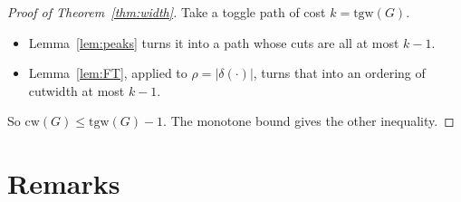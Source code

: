 \documentclass[11pt]{article}
\theoremstyle{definition}
\theoremstyle{remark}
\newcommand{\tgw}{\mathrm{tgw}}
\newcommand{\cw}{\mathrm{cw}}
\begin{document}
\begin{proof}[Proof of Theorem~\ref{thm:width}]
Take a toggle path of cost $k=\tgw(G)$.
\begin{itemize}
\item Lemma~\ref{lem:peaks} turns it into a path whose cuts are all at most
$k-1$.
\item Lemma~\ref{lem:FT}, applied to $\rho=|\delta(\cdot)|$, turns that into
an ordering of cutwidth at most $k-1$.
\end{itemize}
So $\cw(G)\le\tgw(G)-1$. The monotone bound gives the other inequality. \qedhere
\end{proof}

\section{Remarks}
\end{document}
